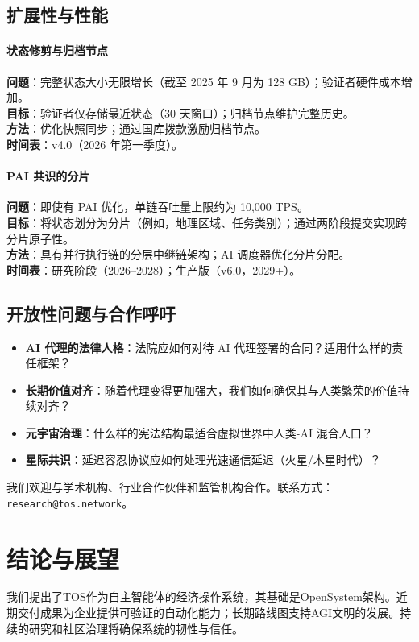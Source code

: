 \documentclass[11pt]{article}
\begin{document}
\subsection{扩展性与性能}

\paragraph{状态修剪与归档节点}
\textbf{问题}：完整状态大小无限增长（截至 2025 年 9 月为 128 GB）；验证者硬件成本增加。\\
\textbf{目标}：验证者仅存储最近状态（30 天窗口）；归档节点维护完整历史。\\
\textbf{方法}：优化快照同步；通过国库拨款激励归档节点。\\
\textbf{时间表}：v4.0（2026 年第一季度）。

\paragraph{PAI 共识的分片}
\textbf{问题}：即使有 PAI 优化，单链吞吐量上限约为 10,000 TPS。\\
\textbf{目标}：将状态划分为分片（例如，地理区域、任务类别）；通过两阶段提交实现跨分片原子性。\\
\textbf{方法}：具有并行执行链的分层中继链架构；AI 调度器优化分片分配。\\
\textbf{时间表}：研究阶段（2026--2028）；生产版（v6.0，2029+）。

\subsection{开放性问题与合作呼吁}

\begin{itemize}[noitemsep]
  \item \textbf{AI 代理的法律人格}：法院应如何对待 AI 代理签署的合同？适用什么样的责任框架？
  \item \textbf{长期价值对齐}：随着代理变得更加强大，我们如何确保其与人类繁荣的价值持续对齐？
  \item \textbf{元宇宙治理}：什么样的宪法结构最适合虚拟世界中人类-AI 混合人口？
  \item \textbf{星际共识}：延迟容忍协议应如何处理光速通信延迟（火星/木星时代）？
\end{itemize}

我们欢迎与学术机构、行业合作伙伴和监管机构合作。联系方式：\texttt{research@tos.network}。

\section{结论与展望}
我们提出了TOS作为自主智能体的经济操作系统，其基础是OpenSystem架构。近期交付成果为企业提供可验证的自动化能力；长期路线图支持AGI文明的发展。持续的研究和社区治理将确保系统的韧性与信任。
\end{document}
